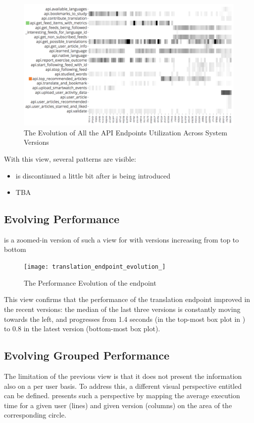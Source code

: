     \begin{figure}
      \centering
      \includegraphics[width=0.9\linewidth]{utilization-evolution}
      \caption{The Evolution of All the API Endpoints Utilization Across System Versions}
      \label{fig:mv-util}
    \end{figure}

  With this view, several patterns are visible:
  \begin{itemize}
    
    \item \epFeedItems is discontinued a little bit after \epTopArticles is being introduced
	\item TBA

  \end{itemize}


  \subsection*{Evolving Performance}

     is a zoomed-in version of such a view for \epTranslationsColor with versions increasing from top to bottom

    \begin{figure}[h!]
      \centering
      \texttt{[image: translation\_endpoint\_evolution\_]}
      \caption{The Performance Evolution of the \epTranslations endpoint}
      \label{fig:tee}
    \end{figure}


  This view confirms that the performance of the translation endpoint improved in the recent versions: the median of the last three versions is constantly moving towards the left, and progresses from 1.4 seconds (in the top-most box plot in ) to 0.8 in the latest version (bottom-most box plot).


\subsection*{Evolving Grouped Performance}
  The limitation of the previous view is that it does not present the information also on a per user basis. To address this, a different visual perspective entitled  can be defined.  presents such a perspective by mapping the average execution time for a given user (lines) and given version (columns) on the area of the corresponding circle. 

